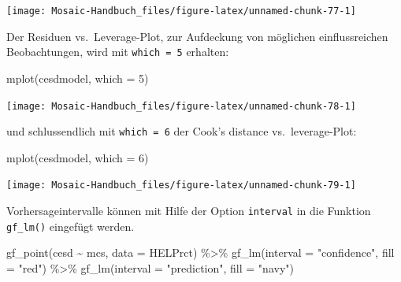 \documentclass[
  ngerman,
]{scrbook}
\newenvironment{Shaded}{\begin{snugshade}}{\end{snugshade}}
\newcommand{\AttributeTok}[1]{\textcolor[rgb]{0.77,0.63,0.00}{#1}}
\newcommand{\DecValTok}[1]{\textcolor[rgb]{0.00,0.00,0.81}{#1}}
\newcommand{\FunctionTok}[1]{\textcolor[rgb]{0.00,0.00,0.00}{#1}}
\newcommand{\NormalTok}[1]{#1}
\newcommand{\SpecialCharTok}[1]{\textcolor[rgb]{0.00,0.00,0.00}{#1}}
\newcommand{\StringTok}[1]{\textcolor[rgb]{0.31,0.60,0.02}{#1}}
\begin{document}
\begin{center}\texttt{[image: Mosaic-Handbuch\_files/figure-latex/unnamed-chunk-77-1]} \end{center}

Der Residuen vs.~Leverage-Plot, zur Aufdeckung von möglichen einflussreichen Beobachtungen, wird mit \texttt{which\ =\ 5} erhalten:

\begin{Shaded}
\begin{Highlighting}[]
\FunctionTok{mplot}\NormalTok{(cesdmodel, }\AttributeTok{which =} \DecValTok{5}\NormalTok{)}
\end{Highlighting}
\end{Shaded}

\begin{center}\texttt{[image: Mosaic-Handbuch\_files/figure-latex/unnamed-chunk-78-1]} \end{center}

und schlussendlich mit \texttt{which\ =\ 6} der Cook's distance vs.~leverage-Plot:

\begin{Shaded}
\begin{Highlighting}[]
\FunctionTok{mplot}\NormalTok{(cesdmodel, }\AttributeTok{which =} \DecValTok{6}\NormalTok{)}
\end{Highlighting}
\end{Shaded}

\begin{center}\texttt{[image: Mosaic-Handbuch\_files/figure-latex/unnamed-chunk-79-1]} \end{center}

Vorhersageintervalle können mit Hilfe der Option \texttt{interval} in die Funktion \texttt{gf\_lm()} eingefügt werden.

\begin{Shaded}
\begin{Highlighting}[]
\FunctionTok{gf\_point}\NormalTok{(cesd }\SpecialCharTok{\textasciitilde{}}\NormalTok{ mcs, }\AttributeTok{data =}\NormalTok{ HELPrct) }\SpecialCharTok{\%\textgreater{}\%}
  \FunctionTok{gf\_lm}\NormalTok{(}\AttributeTok{interval =} \StringTok{"confidence"}\NormalTok{, }\AttributeTok{fill =} \StringTok{"red"}\NormalTok{) }\SpecialCharTok{\%\textgreater{}\%}
  \FunctionTok{gf\_lm}\NormalTok{(}\AttributeTok{interval =} \StringTok{"prediction"}\NormalTok{, }\AttributeTok{fill =} \StringTok{"navy"}\NormalTok{)}
\end{Highlighting}
\end{Shaded}
\end{document}
